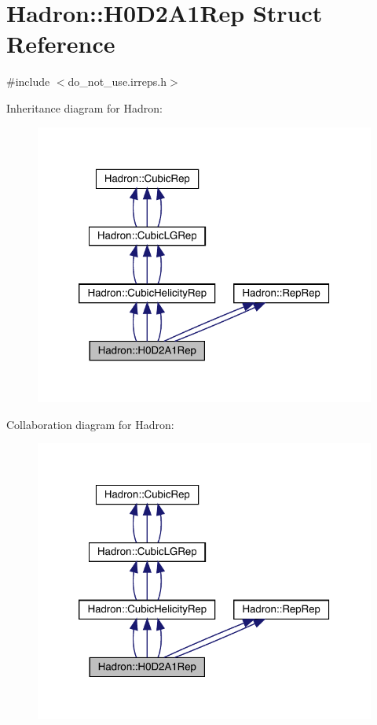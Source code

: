 \hypertarget{structHadron_1_1H0D2A1Rep}{}\section{Hadron\+:\+:H0\+D2\+A1\+Rep Struct Reference}
\label{structHadron_1_1H0D2A1Rep}


{\ttfamily \#include $<$do\+\_\+not\+\_\+use.\+irreps.\+h$>$}



Inheritance diagram for Hadron\+:
\nopagebreak
\begin{figure}[H]
\begin{center}
\leavevmode
\includegraphics[width=320pt]{dd/d85/structHadron_1_1H0D2A1Rep__inherit__graph}
\end{center}
\end{figure}


Collaboration diagram for Hadron\+:
\nopagebreak
\begin{figure}[H]
\begin{center}
\leavevmode
\includegraphics[width=320pt]{db/dbe/structHadron_1_1H0D2A1Rep__coll__graph}
\end{center}
\end{figure}
